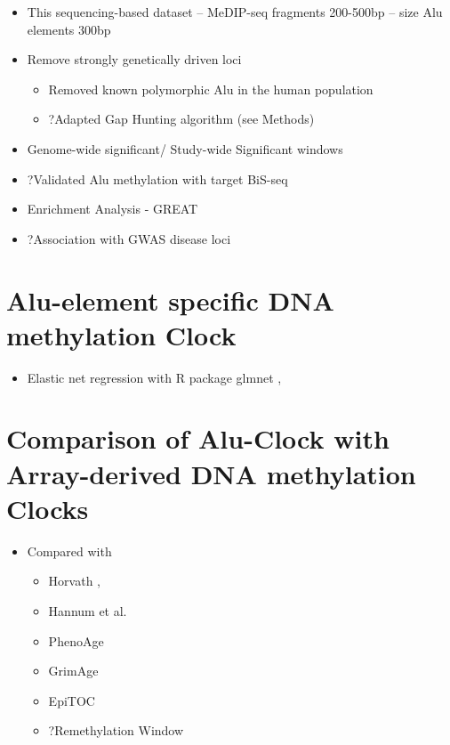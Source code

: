 \documentclass[
]{book}
\providecommand{\tightlist}{%
  \setlength{\itemsep}{0pt}\setlength{\parskip}{0pt}}
\begin{document}
\begin{itemize}
\tightlist
\item
  This sequencing-based dataset -- MeDIP-seq fragments 200-500bp -- size Alu elements 300bp
\item
  Remove strongly genetically driven loci

  \begin{itemize}
  \tightlist
  \item
    Removed known polymorphic Alu in the human population \citep{Payer2017}
  \item
    ?Adapted Gap Hunting algorithm (see Methods)
  \end{itemize}
\item
  Genome-wide significant/ Study-wide Significant windows
\item
  ?Validated Alu methylation with target BiS-seq
\item
  Enrichment Analysis - GREAT \citep{McLean2010}
\item
  ?Association with GWAS disease loci
\end{itemize}

\hypertarget{alu-element-specific-dna-methylation-clock}{%
\section{Alu-element specific DNA methylation Clock}\label{alu-element-specific-dna-methylation-clock}}

\begin{itemize}
\tightlist
\item
  Elastic net regression with R package glmnet \citep{Friedman2010}, \citep{Engebretsen2019}
\end{itemize}

\hypertarget{comparison-of-alu-clock-with-array-derived-dna-methylation-clocks}{%
\section{Comparison of Alu-Clock with Array-derived DNA methylation Clocks}\label{comparison-of-alu-clock-with-array-derived-dna-methylation-clocks}}

\begin{itemize}
\tightlist
\item
  Compared with

  \begin{itemize}
  \tightlist
  \item
    Horvath \citep{Horvath2013} ,
  \item
    Hannum et al.~\citep{Hannum2013}
  \item
    PhenoAge \citep{Levine2018}
  \item
    GrimAge \citep{Lu2019}
  \item
    EpiTOC \citep{Yang2016}
  \item
    ?Remethylation Window \citep{Zhou2018}
  \end{itemize}
\end{itemize}
\end{document}
